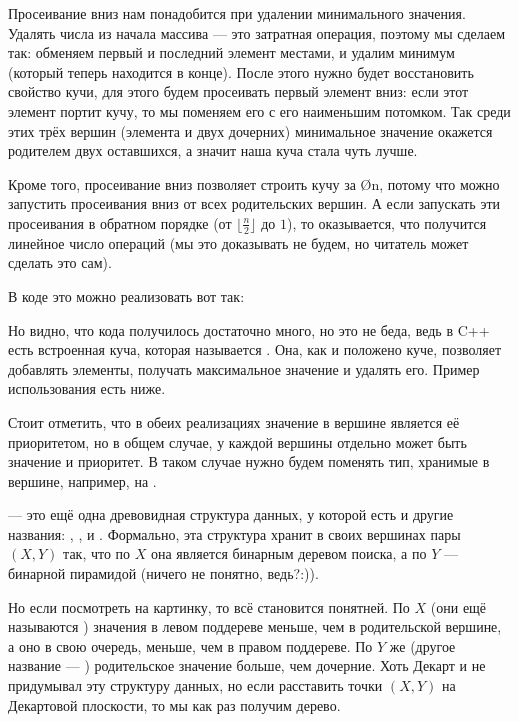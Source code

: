 Просеивание вниз нам понадобится при удалении минимального значения. Удалять числа из начала массива — это затратная операция, поэтому мы сделаем так: обменяем первый и последний элемент местами, и удалим минимум (который теперь находится в конце). После этого нужно будет восстановить свойство кучи, для этого будем просеивать первый элемент вниз: если этот элемент портит кучу, то мы поменяем его с его наименьшим потомком. Так среди этих трёх вершин (элемента и двух дочерних) минимальное значение окажется родителем двух оставшихся, а значит наша куча стала чуть лучше.

Кроме того, просеивание вниз позволяет строить кучу за \O{n}, потому что можно запустить просеивания вниз от всех родительских вершин. А если запускать эти просеивания в обратном порядке (от $\lfloor\frac{n}{2}\rfloor$ до $1$), то оказывается, что получится линейное число операций (мы это доказывать не будем, но читатель может сделать это сам).

В коде это можно реализовать вот так:


Но видно, что кода получилось достаточно много, но это не беда, ведь в C++ есть встроенная куча, которая называется . Она, как и положено куче, позволяет добавлять элементы, получать максимальное значение и удалять его. Пример использования  есть ниже.


Стоит отметить, что в обеих реализациях значение в вершине является её приоритетом, но в общем случае, у каждой вершины отдельно может быть значение и приоритет. В таком случае нужно будем поменять тип, хранимые в вершине, например, на .


 — это ещё одна древовидная структура данных, у которой есть и другие названия: , ,  и . Формально, эта структура хранит в своих вершинах пары $(X, Y)$ так, что по $X$ она является бинарным деревом поиска, а по $Y$ — бинарной пирамидой (ничего не понятно, ведь?:)).

Но если посмотреть на картинку, то всё становится понятней. По $X$ (они ещё называются ) значения в левом поддереве меньше, чем в родительской вершине, а оно в свою очередь, меньше, чем в правом поддереве. По $Y$ же (другое название — ) родительское значение больше, чем дочерние. Хоть Декарт и не придумывал эту структуру данных, но если расставить точки $(X, Y)$ на Декартовой плоскости, то мы как раз получим дерево.

